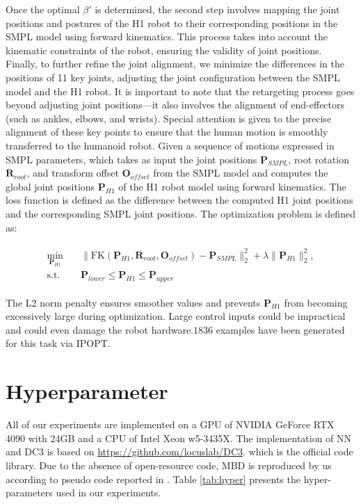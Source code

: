 Once the optimal $\beta'$ is determined, the second step involves mapping the joint positions and postures of the H1 robot to their corresponding positions in the SMPL model using forward kinematics. This process takes into account the kinematic constraints of the robot, ensuring the validity of joint positions.
Finally, to further refine the joint alignment, we minimize the differences in the positions of 11 key joints, adjusting the joint configuration between the SMPL model and the H1 robot. It is important to note that the retargeting process goes beyond adjusting joint positions—it also involves the alignment of end-effectors (such as ankles, elbows, and wrists). Special attention is given to the precise alignment of these key points to ensure that the human motion is smoothly transferred to the humanoid robot.
Given a sequence of motions expressed in SMPL parameters, which takes as input the joint positions $\boldsymbol{P}_{SMPL}$, root rotation $\boldsymbol{R}_{root}$, and transform offset $\boldsymbol{O}_{offset}$ from the SMPL model and computes the global joint positions $\boldsymbol{P}_{H1}$ of the H1 robot model using forward kinematics. The loss function is defined as the difference between the computed H1 joint positions and the corresponding SMPL joint positions. The optimization problem is defined as:

\begin{align}  
\begin{aligned}
\min_{\boldsymbol{P}_{H1}}\quad& \|\text{FK}(\boldsymbol{P}_{H1}, \boldsymbol{R}_{root}, \boldsymbol{O}_{offset}) - \boldsymbol{P}_{SMPL}\|_2^2 + \lambda \|\boldsymbol{P}_{H1}\|_2^2,\\ \text{s.t.}\quad &\boldsymbol{P}_{lower}\le\boldsymbol{P}_{H1}\le\boldsymbol{P}_{upper}
\end{aligned}
\end{align}  

The L2 norm penalty ensures smoother values and prevents $\boldsymbol{P}_{H1}$ from becoming excessively large during optimization. Large control inputs could be impractical and could even damage the robot hardware.\(1836\) examples have been generated for this task via IPOPT.


\section{Hyperparameter}

All of our experiments are implemented on a GPU of NVIDIA GeForce RTX 4090 with 24GB and a CPU of Intel Xeon w5-3435X. The implementation of NN and DC3 is based on \url{https://github.com/locuslab/DC3}. which is the official code library. Due to the absence of open-resource code, MBD is reproduced by us according to pseudo code reported in \cite{pan2024model}. Table \ref{tab:hyper} presents the hyper-parameters used in our experiments. 


